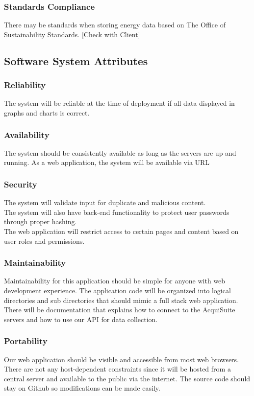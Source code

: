 \documentclass[onecolumn, draftclsnofoot,10pt, compsoc]{IEEEtran}
\begin{document}
    \subsubsection{Standards Compliance}
    There may be standards when storing energy data based on The Office of Sustainability Standards.
    [Check with Client]

    \subsection{Software System Attributes}
    
    \subsubsection{Reliability}
    The system will be reliable at the time of deployment if all data displayed in graphs and charts is correct.\\
    \subsubsection{Availability}
    The system should be consistently available as long as the servers are up and running. As a web application, the system will be available via URL 
    \subsubsection{Security}
    The system will validate input for duplicate and malicious content.\\
    The system will also have back-end functionality to protect user passwords through proper hashing.\\
    The web application will restrict access to certain pages and content based on user roles and permissions.

    \subsubsection{Maintainability}
    Maintainability for this application should be simple for anyone with web development experience. The application code will be organized into logical directories and sub directories that should mimic a full stack web application. There will be documentation that explains how to connect to the AcquiSuite servers and how to use our API for data collection.
    \subsubsection{Portability}
    Our web application should be visible and accessible from most web browsers. There are not any host-dependent constraints since it will be hosted from a central server and available to the public via the internet. The source code should stay on Github so modifications can be made easily.
    
\end{document}
